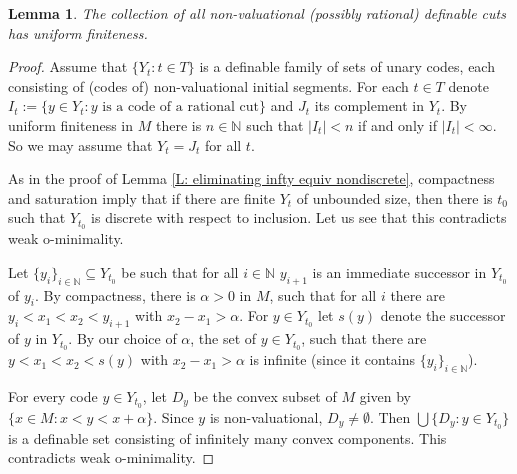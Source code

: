 \documentclass[11pt]{amsart}
\newtheorem{lemma}[theorem]{Lemma}
\theoremstyle{definition}
\newcommand{\Nn}{{\mathbb{N}}}
\newcommand{\0}{\emptyset}
\def\sub{\subseteq}
\begin{document}
\begin{lemma}\label{L: eliminating non-valuational}
The collection of all non-valuational (possibly rational) definable cuts has uniform finiteness. 
\end{lemma}
\begin{proof} 
Assume that $\{Y_t:t\in T\}$ is a definable family of sets of unary codes, each consisting of (codes of) non-valuational initial segments.  For each $t\in T$ denote $I_t:=\{y\in Y_t: y \text{ is a code of a rational cut}\}$ and $J_t$ its complement in $Y_t$. By uniform finiteness in $M$ there is $n\in \Nn$ such that $|I_t|<n$ if and only if $|I_t|<\infty$. So we may assume that $Y_t=J_t$ for all $t$. 


As in the proof of Lemma \ref{L: eliminating infty equiv nondiscrete}, compactness and saturation imply that if there are finite $Y_t$ of unbounded size, then there is $t_0$ such that $Y_{t_0}$ is discrete with respect to inclusion. Let us see that this contradicts weak o-minimality. 

Let $\{y_i\}_{i\in \Nn}\sub Y_{t_0}$ be such that for all $i\in \Nn$ $y_{{i+1}}$ is an immediate successor in $Y_{t_0}$ of $y_{i}$.  By compactness, there is $\alpha>0$ in $M$,  such that for all $i$ there are $y_i<x_1<x_2<y_{i+1}$ with $x_2-x_1>\alpha$. 
For $y\in Y_{t_0}$ let $s(y)$ denote the successor of $y$ in $Y_{t_0}$. By our choice of $\alpha$, the set of  $y\in Y_{t_0}$, such that  there are $y<x_1<x_2<s(y)$ with $x_2-x_1>\alpha$ is infinite (since it contains $\{y_i\}_{i\in \Nn}$). 

For every code $y\in Y_{t_0}$, let $D_y$ be the convex subset of $M$ given by 
$\{x\in M: x<y< x+\alpha \}$. Since $y$ is non-valuational, $D_y\neq \0$. 
Then $\bigcup\{D_y: y\in Y_{t_0}\}$ is a definable set consisting of infinitely many convex components. This contradicts weak o-minimality.  
\end{proof}
\end{document}
